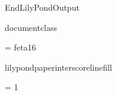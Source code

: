 %
%
%
\edef\lilyponddefsELC{\the\endlinechar}%
\relax

\def\ifundefined#1{
  \expandafter\ifx\csname#1\endcsname\relax
}


\ifx\mustmakelilypondtitle\undefined
\else
  \makelilypondtitle
\fi

\ifx\mustmakelilypondpiecetitle\undefined
\else
  \makelilypondpiecetitle
\fi


\def\SkipLilydefs{
  \endlinechar \lilyponddefsELC
  \endinput}
\ifundefined{EndLilyPondOutput}
  \def\EndLilyPondOutput{\csname bye\endcsname}
  \def\SkipLilydefs{}
\fi
\SkipLilydefs


\ifundefined{documentclass}
  
\else
  
\fi



\font\fetasixteen = feta16
\def\fetafont{\fetasixteen}
\def\fetachar#1{\hbox{\fetasixteen#1}}

\def\botalign#1{
  \vbox to 0pt{\vss #1}
}
\def\leftalign#1{
  \hbox to 0pt{#1\hss}
}


%
%

\def\myfilbreak{}%


\ifundefined{lilypondpaperinterscorelinefill}
  \def\lilypondpaperinterscorelinefill{0}
\else
  \def\lilypondpaperinterscorelinefill{1}
\fi

\def\interscoreline{
  \vskip \lilypondpaperinterscoreline \lilypondpaperunit
    plus \lilypondpaperinterscorelinefill fill
}

\def\placebox#1#2#3{
  \botalign{
    \hbox{\raise #1\leftalign{\kern #2{}#3}}
  }
}

\ifx\pdfoutput\undefined  
  
\else
  \ifx\pdfoutput\relax
    
  \else
    \pdfoutput = 1
    
  \fi
\fi

